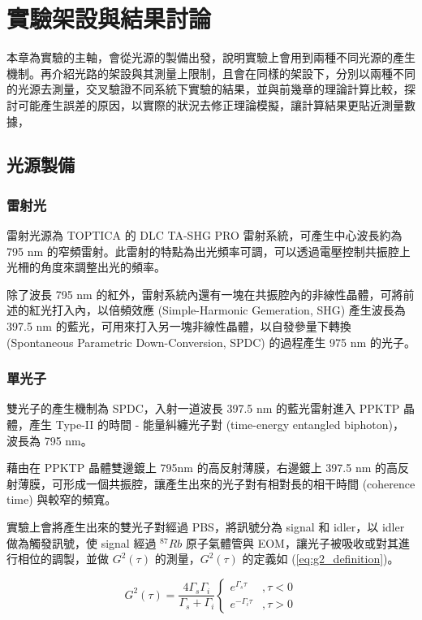 \documentclass[class=NCU_thesis, crop=false]{standalone}
\begin{document}
\chapter{實驗架設與結果討論}
本章為實驗的主軸，會從光源的製備出發，說明實驗上會用到兩種不同光源的產生機制。再介紹光路的架設與其測量上限制，且會在同樣的架設下，分別以兩種不同的光源去測量，交叉驗證不同系統下實驗的結果，並與前幾章的理論計算比較，探討可能產生誤差的原因，以實際的狀況去修正理論模擬，讓計算結果更貼近測量數據，

\section{光源製備}

\subsection{雷射光}
雷射光源為 TOPTICA 的 DLC TA-SHG PRO 雷射系統，可產生中心波長約為 795 nm 的窄頻雷射。此雷射的特點為出光頻率可調，可以透過電壓控制共振腔上光柵的角度來調整出光的頻率。

除了波長 795 nm 的紅外，雷射系統內還有一塊在共振腔內的非線性晶體，可將前述的紅光打入內，以倍頻效應 (Simple-Harmonic Gemeration, SHG) 產生波長為 397.5 nm 的藍光，可用來打入另一塊非線性晶體，以自發參量下轉換 (Spontaneous Parametric Down-Conversion, SPDC) 的過程產生 975 nm 的光子。


\subsection{單光子}
\label{subsection:single_photon}
雙光子的產生機制為 SPDC，入射一道波長 397.5 nm 的藍光雷射進入 PPKTP 晶體，產生 Type-II 的時間 - 能量糾纏光子對 (time-energy entangled biphoton)，波長為 795 nm。

藉由在 PPKTP 晶體雙邊鍍上 795nm 的高反射薄膜，右邊鍍上 397.5 nm 的高反射薄膜，可形成一個共振腔，讓產生出來的光子對有相對長的相干時間 (coherence time) 與較窄的頻寬。

實驗上會將產生出來的雙光子對經過 PBS，將訊號分為 signal 和 idler，以 idler 做為觸發訊號，使 signal 經過 $^{87}Rb$ 原子氣體管與 EOM，讓光子被吸收或對其進行相位的調製，並做 $G^{2}(\tau)$ 的測量，$G^{2}(\tau)$ 的定義如 (\ref{eq:g2_definition})。

\begin{equation}
    G^{2}(\tau)=\frac{4\Gamma_{s}\Gamma_{i}}{\Gamma_{s}+\Gamma_{i}}\left\{\begin{matrix}
        e^{\Gamma_{s}\tau} & ,\tau<0\\
        e^{-\Gamma_{i}\tau} & ,\tau>0
        \end{matrix}\right.
\label{eq:g2_definition}
\end{equation}
\end{document}
